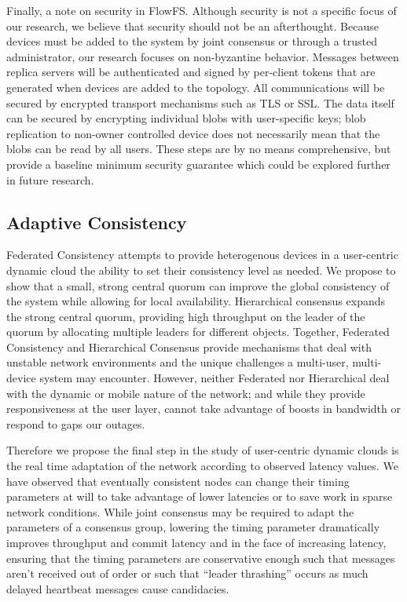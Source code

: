\documentclass{article}
\begin{document}
Finally, a note on security in FlowFS. Although security is not a specific focus of our research, we believe that security should not be an afterthought. Because devices must be added to the system by joint consensus or through a trusted administrator, our research focuses on non-byzantine behavior. Messages between replica servers will be authenticated and signed by per-client tokens that are generated when devices are added to the topology. All communications will be secured by encrypted transport mechanisms such as TLS or SSL. The data itself can be secured by encrypting individual blobs with user-specific keys; blob replication to non-owner controlled device does not necessarily mean that the blobs can be read by all users. These steps are by no means comprehensive, but provide a baseline minimum security guarantee which could be explored further in future research.

\subsection{Adaptive Consistency}
\label{sec:adaptive}

Federated Consistency attempts to provide heterogenous devices in a user-centric dynamic cloud the ability to set their consistency level as needed. We propose to show that a small, strong central quorum can improve the global consistency of the system while allowing for local availability. Hierarchical consensus expands the strong central quorum, providing high throughput on the leader of the quorum by allocating multiple leaders for different objects. Together, Federated Consistency and Hierarchical Consensus provide mechanisms that deal with unstable network environments and the unique challenges a multi-user, multi-device system may encounter. However, neither Federated nor Hierarchical deal with the dynamic or mobile nature of the network; and while they provide responsiveness at the user layer, cannot take advantage of boosts in bandwidth or respond to gaps our outages.

Therefore we propose the final step in the study of user-centric dynamic clouds is the real time adaptation of the network according to observed latency values. We have observed that eventually consistent nodes can change their timing parameters at will to take advantage of lower latencies or to save work in sparse network conditions. While joint consensus may be required to adapt the parameters of a consensus group, lowering the timing parameter dramatically improves throughput and commit latency and in the face of increasing latency, ensuring that the timing parameters are conservative enough such that messages aren't received out of order or such that ``leader thrashing'' occurs as much delayed heartbeat messages cause candidacies.
\end{document}
